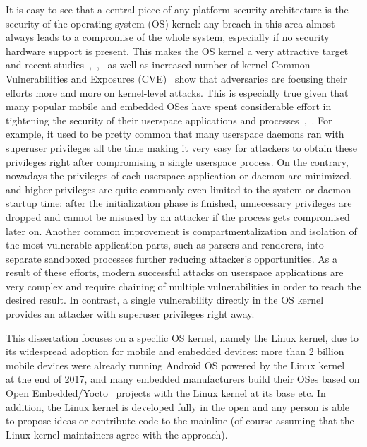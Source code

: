 
It is easy to see that a central piece of any platform security architecture is the security of the operating system (OS) kernel: any breach in this area almost always leads to a compromise of the whole system, especially if no security hardware support is present. This makes the OS kernel a very attractive target and recent studies~\cite{stoep2016android},~\cite{tolvanen2017},~\cite{windowsexploits} as well as increased number of kernel Common Vulnerabilities and Exposures (CVE)~\cite{nistCves} show that adversaries are focusing their efforts more and more on kernel-level attacks. This is especially true given that many popular mobile and embedded OSes have spent considerable effort in tightening the security of their userspace applications and processes~\cite{stoep2016android},~\cite{tolvanen2017}. For example, it used to be pretty common that many userspace daemons ran with superuser privileges all the time making it very easy for attackers to obtain these privileges right after compromising a single userspace process. On the contrary, nowadays the privileges of each userspace application or daemon are minimized, and higher privileges are quite commonly even limited to the system or daemon startup time: after the initialization phase is finished, unnecessary privileges are dropped and cannot be misused by an attacker if the process gets compromised later on. Another common improvement is compartmentalization and isolation of the most vulnerable application parts, such as parsers and renderers, into separate sandboxed processes further reducing attacker's opportunities. As a result of these efforts, modern successful attacks on userspace applications are very complex and require chaining of multiple vulnerabilities in order to reach the desired result. In contrast, a single vulnerability directly in the OS kernel provides an attacker with superuser privileges right away.

This dissertation focuses on a specific OS kernel, namely the Linux kernel, due to its widespread adoption for mobile and embedded devices: more than 2 billion mobile devices were already running Android OS powered by the Linux kernel~\cite{googleio2017} at the end of 2017, and many embedded manufacturers build their OSes based on Open Embedded/Yocto~\cite{OE2017, yocto2017} projects with the Linux kernel at its base etc. 
In addition, the Linux kernel is developed fully in the open and any person is able to propose ideas or contribute code to the mainline (of course assuming that the Linux kernel maintainers agree with the approach).

